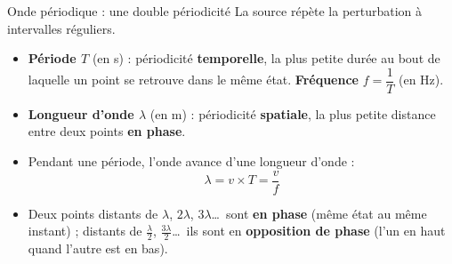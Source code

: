 \documentclass[11pt,a4paper]{article}
\begin{document}
\begin{cours}{Onde périodique : une double périodicité}
La source répète la perturbation à intervalles réguliers.
\begin{itemize}
  \item \textbf{Période $T$} (en s) : périodicité \textbf{temporelle}, la plus petite durée au bout de laquelle un point se retrouve dans le même état. \textbf{Fréquence} $f = \dfrac{1}{T}$ (en Hz).
  \item \textbf{Longueur d'onde $\lambda$} (en m) : périodicité \textbf{spatiale}, la plus petite distance entre deux points \textbf{en phase}.
  \item Pendant une période, l'onde avance d'une longueur d'onde :
  \[ \boxed{\,\lambda = v \times T = \frac{v}{f}\,} \]
  \item Deux points distants de $\lambda$, $2\lambda$, $3\lambda$\dots\ sont \textbf{en phase} (même état au même instant) ; distants de $\frac{\lambda}{2}$, $\frac{3\lambda}{2}$\dots\ ils sont en \textbf{opposition de phase} (l'un en haut quand l'autre est en bas).
\end{itemize}

\begin{minipage}{0.48\linewidth}
\centering
{}
\end{minipage}\hfill
\begin{minipage}{0.48\linewidth}
\centering
{}
\end{minipage}
\end{cours}
\end{document}
